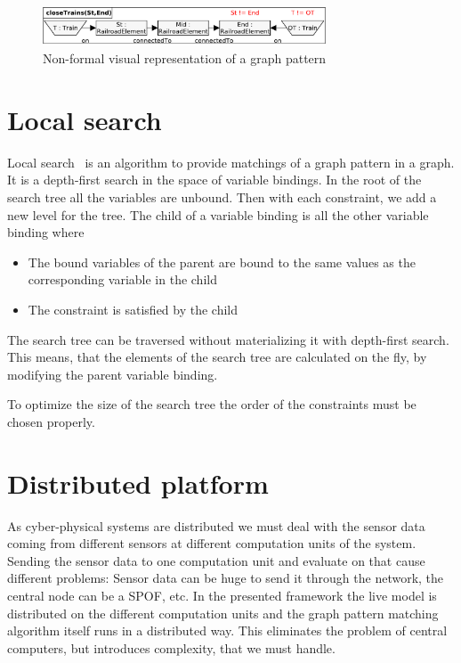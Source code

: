 \begin{figure}[h]
	\begin{center}
		\includegraphics[width=0.75\textwidth]{figures/pattern-visual.pdf}
		\caption{Non-formal visual representation of a graph pattern}
		\label{pattern-visual}
	\end{center}
\end{figure}


\section{Local search}

Local search~\cite{bur-marton-msc} is an algorithm to provide matchings of a graph pattern in a graph. It is a depth-first search in the space of variable bindings. In the root of the search tree all the variables are unbound. Then with each constraint, we add a new level for the tree. The child of a variable binding is all the other variable binding where 
\begin{itemize}
	\item The bound variables of the parent are bound to the same values as the corresponding variable in the child
	\item The constraint is satisfied by the child
\end{itemize}

The search tree can be traversed without materializing it with depth-first search. This means, that the elements of the search tree are calculated on the fly, by modifying the parent variable binding.

To optimize the size of the search tree the order of the constraints must be chosen properly. 

\section{Distributed platform}


As cyber-physical systems are distributed we must deal with the sensor data coming from different sensors at different computation units of the system. Sending the sensor data to one computation unit and evaluate on that cause different problems: Sensor data can be huge to send it through the network, the central node can be a SPOF, etc. In the presented framework the live model is distributed on the different computation units and the graph pattern matching algorithm itself runs in a distributed way. This eliminates the problem of central computers, but introduces complexity, that we must handle. 








